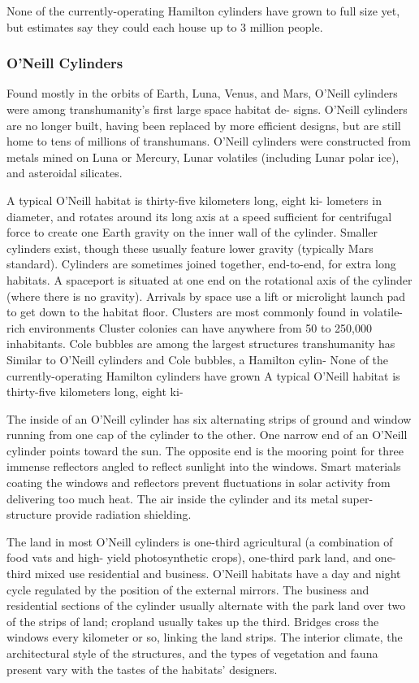 None of the currently-operating Hamilton cylinders have grown 
to full size yet, but estimates say they could each house up to 3 
million people.

\subsubsection{O'Neill Cylinders}

Found mostly in the orbits of Earth, Luna, Venus, and Mars, O'Neill 
cylinders were among transhumanity's first large space habitat de-
signs. O'Neill cylinders are no longer built, having been replaced 
by more efficient designs, but are still home to tens of millions of 
transhumans. O'Neill cylinders were constructed from metals mined 
on Luna or Mercury, Lunar volatiles (including Lunar polar ice), 
and asteroidal silicates.

A typical O'Neill habitat is thirty-five kilometers long, eight ki-
lometers in diameter, and rotates around its long axis at a speed 
sufficient for centrifugal force to create one Earth gravity on the 
inner wall of the cylinder. Smaller cylinders exist, though these 
usually feature lower gravity (typically Mars standard). Cylinders 
are sometimes joined together, end-to-end, for extra long habitats. 
A spaceport is situated at one end on the rotational axis of the 
cylinder (where there is no gravity). Arrivals by space use a lift or 
microlight launch pad to get down to the habitat floor.
Clusters are most commonly found in volatile-rich environments 
Cluster colonies can have anywhere from 50 to 250,000 inhabitants.
Cole bubbles are among the largest structures transhumanity has 
Similar to O'Neill cylinders and Cole bubbles, a Hamilton cylin-
None of the currently-operating Hamilton cylinders have grown 
A typical O'Neill habitat is thirty-five kilometers long, eight ki-

The inside of an O'Neill cylinder has six alternating 
strips of ground and window running from one cap 
of the cylinder to the other. One narrow end of an 
O'Neill cylinder points toward the sun. The opposite 
end is the mooring point for three immense reflectors 
angled to reflect sunlight into the windows. Smart 
materials coating the windows and reflectors prevent 
fluctuations in solar activity from delivering too much 
heat. The air inside the cylinder and its metal super-
structure provide radiation shielding.

The land in most O'Neill cylinders is one-third 
agricultural (a combination of food vats and high-
yield photosynthetic crops), one-third park land, and 
one-third mixed use residential and business. O'Neill 
habitats have a day and night cycle regulated by the 
position of the external mirrors. The business and 
residential sections of the cylinder usually alternate 
with the park land over two of the strips of land; 
cropland usually takes up the third. Bridges cross 
the windows every kilometer or so, linking the land 
strips. The interior climate, the architectural style of 
the structures, and the types of vegetation and fauna 
present vary with the tastes of the habitats' designers.

